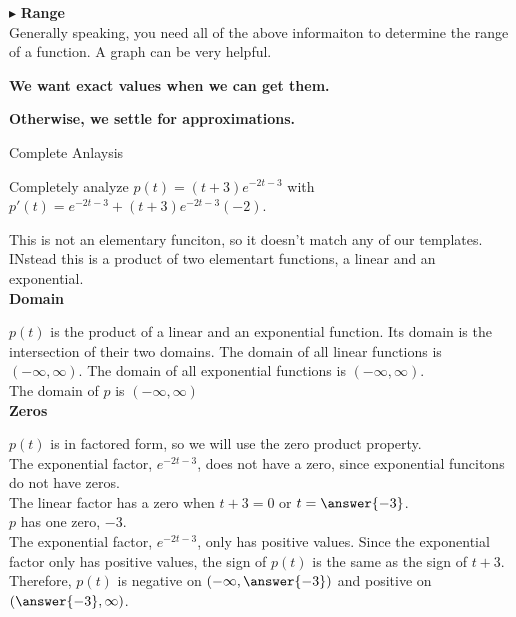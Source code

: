 \documentclass{ximera}
\begin{document}
$\blacktriangleright$ \textbf{\textcolor{red!10!blue!90!}{Range}}   \\
Generally speaking, you need all of the above informaiton to determine the range of a function.  A graph can be very helpful. \\



\begin{center}
\textbf{\textcolor{red!70!black}{We want exact values when we can get them.}}

\textbf{\textcolor{red!70!black}{Otherwise, we settle for approximations.}}
\end{center}








\begin{example} Complete Anlaysis

Completely analyze $p(t) = (t+3)e^{-2t-3}$ with $p'(t) = e^{-2t-3} + (t+3) e^{-2t-3} (-2)$.


This is not an elementary funciton, so it doesn't match any of our templates. INstead this is a product of two elementart functions, a linear and an exponential. \\



\textbf{Domain}

$p(t)$ is the product of a linear and an exponential function. Its domain is the intersection of their two domains. The domain of all linear functions is $(-\infty, \infty)$. The domain of all exponential functions is $(-\infty, \infty)$. \\

The domain of $p$ is $(-\infty, \infty)$\.\\



\textbf{Zeros}

$p(t)$ is in factored form, so we will use the zero product property. \\
The exponential factor, $e^{-2t-3}$, does not have a zero, since exponential funcitons do not have zeros. \\  
The linear factor has a zero when $t+3=0$ or $t=\answer{-3}$.  \\


$p$ has one zero, $-3$. \\



The exponential factor, $e^{-2t-3}$, only has positive values.   Since the exponential factor only has positive values, the sign of $p(t)$ is the same as the sign of $t+3$.  Therefore, $p(t)$ is negative on $\left( -\infty, \answer{-3} \right)$ and positive on $\left( \answer{-3}, \infty \right)$.  






\end{example}
\end{document}
